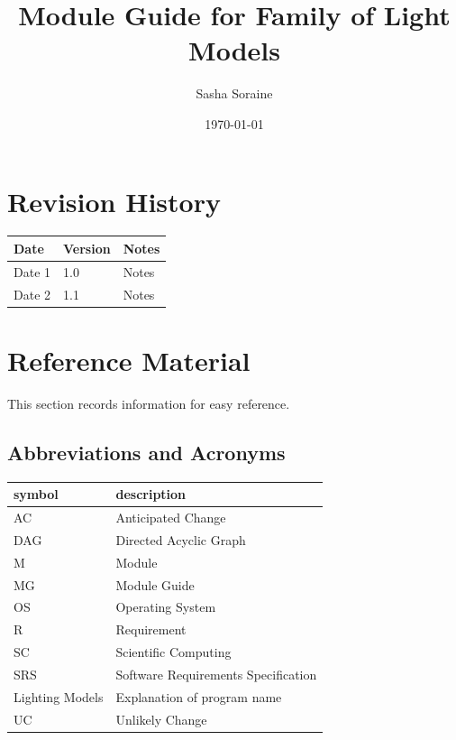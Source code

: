 \documentclass[12pt, titlepage]{article}
\begin{document}
\title{Module Guide for Family of Light Models} 
\author{Sasha Soraine}
\date{\today}

\maketitle


\section{Revision History}

\begin{tabularx}{\textwidth}{p{3cm}p{2cm}X}
\toprule {\bf Date} & {\bf Version} & {\bf Notes}\\
\midrule
Date 1 & 1.0 & Notes\\
Date 2 & 1.1 & Notes\\
\bottomrule
\end{tabularx}

\newpage

\section{Reference Material}

This section records information for easy reference.

\subsection{Abbreviations and Acronyms}

\renewcommand{\arraystretch}{1.2}
\begin{tabular}{l l} 
  \toprule		
  \textbf{symbol} & \textbf{description}\\
  \midrule 
  AC & Anticipated Change\\
  DAG & Directed Acyclic Graph \\
  M & Module \\
  MG & Module Guide \\
  OS & Operating System \\
  R & Requirement\\
  SC & Scientific Computing \\
  SRS & Software Requirements Specification\\
  Lighting Models & Explanation of program name\\
  UC & Unlikely Change \\
  \bottomrule
\end{tabular}\\
\end{document}
